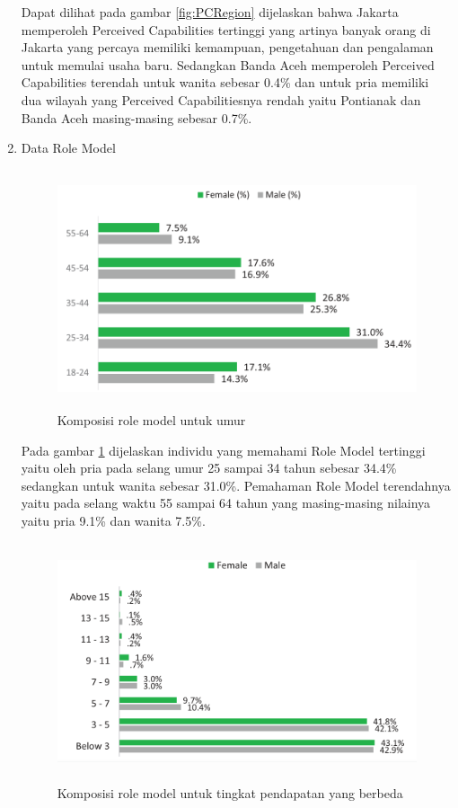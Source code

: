 \begin{enumerate}
Dapat dilihat pada gambar \ref{fig:PCRegion} dijelaskan bahwa Jakarta memperoleh Perceived Capabilities tertinggi yang artinya banyak orang di Jakarta yang percaya memiliki kemampuan, pengetahuan dan pengalaman untuk memulai usaha baru. Sedangkan Banda Aceh memperoleh Perceived Capabilities terendah untuk wanita sebesar 0.4\% dan untuk pria memiliki dua wilayah yang Perceived Capabilitiesnya rendah yaitu Pontianak dan Banda Aceh masing-masing sebesar 0.7\%.
	\item Data Role Model
\begin{figure} [H]
	\centering  
	\includegraphics[width=12cm, height=7cm]{umurRM2013} 
	\caption[Komposisi role model untuk umur]{Komposisi role model untuk umur} 
	\label{fig:RMUmur} 
\end{figure}


Pada gambar \ref{fig:RMUmur} dijelaskan individu yang memahami Role Model tertinggi yaitu oleh pria pada selang umur 25 sampai 34 tahun sebesar 34.4\% sedangkan untuk wanita sebesar 31.0\%. Pemahaman Role Model terendahnya yaitu pada selang waktu 55 sampai 64 tahun yang masing-masing nilainya yaitu pria 9.1\% dan wanita 7.5\%.


\begin{figure} [H]
	\centering  
	\includegraphics[width=13cm, height=7cm]{pendapatanRM2013} 
	\caption[Komposisi role model untuk tingkat pendapatan yang berbeda]{Komposisi role model untuk tingkat pendapatan yang berbeda} 
	\label{fig:RMpendapatan} 
\end{figure}  



\end{enumerate}

